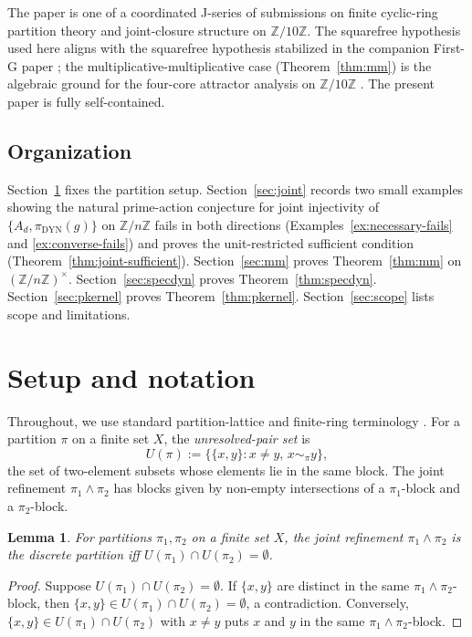 \documentclass[11pt,reqno]{amsart}
\theoremstyle{plain}
\newtheorem{lemma}[theorem]{Lemma}
\theoremstyle{definition}
\theoremstyle{remark}
\DeclareMathOperator{\dyn}{DYN}
\newcommand{\Z}{\mathbb{Z}}
\begin{document}
The paper is one of a coordinated J-series of submissions on finite
cyclic-ring partition theory and joint-closure structure on $\Z/10\Z$.
The squarefree hypothesis used here aligns with the squarefree
hypothesis stabilized in the companion First-G paper
\cite{SandersGish2026FirstG}; the multiplicative-multiplicative
case (Theorem~\ref{thm:mm}) is the algebraic ground for the four-core
attractor analysis on $\Z/10\Z$ \cite{SandersGish2026FourCore}. The
present paper is fully self-contained.

\subsection{Organization}

Section~\ref{sec:setup} fixes the partition setup. Section~\ref{sec:joint}
records two small examples showing the natural prime-action conjecture
for joint injectivity of $\{A_{d}, \pi_{\dyn}(g)\}$ on $\Z/n\Z$ fails
in both directions (Examples~\ref{ex:necessary-fails} and
\ref{ex:converse-fails}) and proves the unit-restricted sufficient
condition (Theorem~\ref{thm:joint-sufficient}).
Section~\ref{sec:mm} proves Theorem~\ref{thm:mm} on
$(\Z/n\Z)^{\times}$. Section~\ref{sec:specdyn} proves
Theorem~\ref{thm:specdyn}. Section~\ref{sec:pkernel} proves
Theorem~\ref{thm:pkernel}. Section~\ref{sec:scope} lists scope and
limitations.

\section{Setup and notation}\label{sec:setup}

Throughout, we use standard partition-lattice and finite-ring
terminology \cite{Birkhoff1940,Stanley1999,Lang2002,DummitFoote2004}.
For a partition $\pi$ on a finite set $X$, the \emph{unresolved-pair
set} is
\[
  U(\pi) := \big\{\{x, y\} : x \ne y, \, x \sim_{\pi} y\big\},
\]
the set of two-element subsets whose elements lie in the same block.
The joint refinement $\pi_{1} \wedge \pi_{2}$ has blocks given by
non-empty intersections of a $\pi_{1}$-block and a $\pi_{2}$-block.

\begin{lemma}\label{lem:joint-disjoint}
For partitions $\pi_{1}, \pi_{2}$ on a finite set $X$, the joint
refinement $\pi_{1} \wedge \pi_{2}$ is the discrete partition iff
$U(\pi_{1}) \cap U(\pi_{2}) = \emptyset$.
\end{lemma}

\begin{proof}
Suppose $U(\pi_{1}) \cap U(\pi_{2}) = \emptyset$. If $\{x, y\}$ are
distinct in the same $\pi_{1} \wedge \pi_{2}$-block, then $\{x, y\}
\in U(\pi_{1}) \cap U(\pi_{2}) = \emptyset$, a contradiction.
Conversely, $\{x, y\} \in U(\pi_{1}) \cap U(\pi_{2})$ with $x \ne y$
puts $x$ and $y$ in the same $\pi_{1} \wedge \pi_{2}$-block.
\end{proof}
\end{document}
